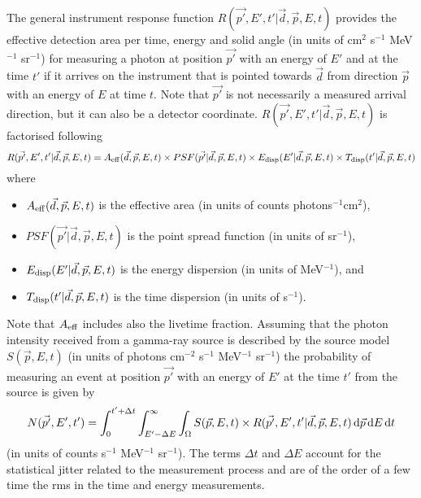 \documentclass{article}[12pt,a4]
\begin{document}
The general instrument response function
$R(\vec{p'}, E', t' | \vec{d}, \vec{p}, E, t)$
provides the effective detection area per time, energy and solid angle
(in units of cm$^2$ s$^{-1}$ MeV$^{-1}$ sr$^{-1}$) 
for measuring a photon at position $\vec{p'}$ with an energy of $E'$ and at the time $t'$ if it 
arrives on the instrument that is pointed towards $\vec{d}$ from direction $\vec{p}$ with an 
energy of $E$ at time $t$.
Note that $\vec{p'}$ is not necessarily a measured arrival direction, but it can also be
a detector coordinate.
$R(\vec{p'}, E', t' | \vec{d}, \vec{p}, E, t)$ is factorised following
\begin{equation}
R(\vec{p'}, E', t' | \vec{d}, \vec{p}, E, t) = 
A_{\rm eff}(\vec{d}, \vec{p}, E, t) \times
PSF(\vec{p'} | \vec{d}, \vec{p}, E, t) \times
E_{\rm disp}(E' | \vec{d}, \vec{p}, E, t) \times
T_{\rm disp}(t' | \vec{d}, \vec{p}, E, t)
\label{eq:rspfact}
\end{equation}
where
\begin{itemize}
\item[] $A_{\rm eff}(\vec{d}, \vec{p}, E, t)$ is the effective area (in units of counts photons$^{-1}$cm$^2$),
\item[] $PSF(\vec{p'} | \vec{d}, \vec{p}, E, t)$ is the point spread function (in units of sr$^{-1}$),
\item[] $E_{\rm disp}(E' | \vec{d}, \vec{p}, E, t)$ is the energy dispersion (in units of MeV$^{-1}$), and
\item[] $T_{\rm disp}(t' | \vec{d}, \vec{p}, E, t)$ is the time dispersion (in units of s$^{-1}$).
\end{itemize}
Note that $A_{\rm eff}$ includes also the livetime fraction.
Assuming that the photon intensity received from a gamma-ray source is described by
the source model $S(\vec{p}, E, t)$ (in units of photons cm$^{-2}$ s$^{-1}$ MeV$^{-1}$ sr$^{-1}$)
the probability of measuring an event at position $\vec{p'}$ with an
energy of $E'$ at the time $t'$ from the source is given by
\begin{equation}
N(\vec{p'}, E', t') = \int_{0}^{t'+\Delta t} \int_{E'-\Delta E}^{\infty} \int_{\Omega} 
S(\vec{p}, E, t) \times R(\vec{p'}, E', t' | \vec{d}, \vec{p}, E, t) \, {\rm d}\vec{p} \, {\rm d}E \,{\rm d}t
\label{eq:model}
\end{equation}
(in units of counts s$^{-1}$ MeV$^{-1}$ sr$^{-1}$).
The terms $\Delta t$ and $\Delta E$ account for the statistical jitter related to the measurement
process and are of the order of a few time the rms in the time and energy measurements.
\end{document}
